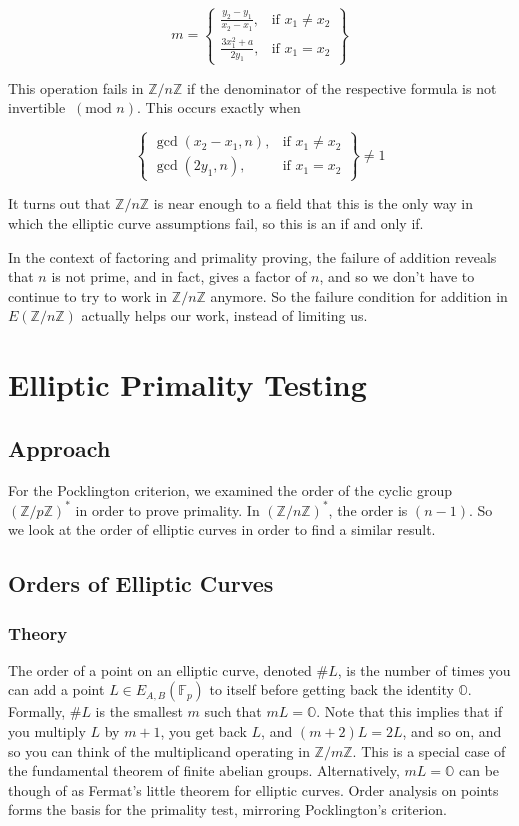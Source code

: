 \documentclass[]{article}
\newcommand{\Z}{\mathbb{Z}}
\newcommand{\OS}{\mathbb{O}}
\newcommand{\ZMZ}[1]{\Z/#1\Z}
\newcommand{\F}{\mathbb{F}}
\newcommand{\Mod}[1]{\ (\text{mod }#1)}
\begin{document}
\[
m = \left\{\begin{array}{lr}
\frac{y_2-y_1}{x_2-x_1}, & \text{if } x_1 \ne x_2 \\
\frac{3x_1^2+a}{2y_1}, & \text{if } x_1 = x_2
\end{array}\right\}
\]

This operation fails in $\ZMZ{n}$ if the denominator of the respective formula is not invertible $\Mod{n}$. This occurs exactly when

\[
\left\{\begin{array}{lr}
\gcd(x_2-x_1,n), & \text{if } x_1 \ne x_2 \\
\gcd(2y_1,n), & \text{if } x_1 = x_2
\end{array}\right\}
\ne 1
\]

It turns out that $\ZMZ{n}$ is near enough to a field that this is the only way in which the elliptic curve assumptions fail, so this is an if and only if.

In the context of factoring and primality proving, the failure of addition reveals that $n$ is not prime, and in fact, gives a factor of $n$, and so we don't have to continue to try to work in $\ZMZ{n}$ anymore. So the failure condition for addition in $E(\ZMZ{n})$ actually helps our work, instead of limiting us.


\section{Elliptic Primality Testing}

\subsection{Approach}

For the Pocklington criterion, we examined the order of the cyclic group $(\ZMZ{p})^*$ in order to prove primality. In $(\ZMZ{n})^*$, the order is $(n-1)$. So we look at the order of elliptic curves in order to find a similar result.

\subsection{Orders of Elliptic Curves}

\subsubsection{Theory}
The order of a point on an elliptic curve, denoted $\#L$, is the number of times you can add a point $L \in E_{A,B}(\F_p)$ to itself before getting back the identity $\OS$. Formally, $\#L$ is the smallest $m$ such that $mL = \OS$. Note that this implies that if you multiply $L$ by $m+1$, you get back $L$, and $(m+2)L = 2L$, and so on, and so you can think of the multiplicand operating in $\ZMZ{m}$. This is a special case of the fundamental theorem of finite abelian groups. Alternatively, $mL = \OS$ can be though of as Fermat's little theorem for elliptic curves. Order analysis on points forms the basis for the primality test, mirroring Pocklington's criterion.
\end{document}
